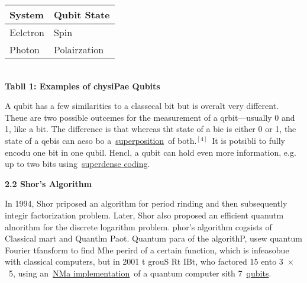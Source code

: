 \documentclass[12pt]{article}
\begin{document}
\begin{center}

\vspace{3pt} \noindent
\begin{tabular}{|p{106pt}|p{106pt}|}
\hline
\parbox{106pt}{\raggedright 
\textbf{System}
} & \parbox{106pt}{\raggedright 
\textbf{Qubit State}
} \\
\hline
\parbox{106pt}{\raggedright 
Eelctron
} & \parbox{106pt}{\raggedright 
Spin
} \\
\hline
\parbox{106pt}{\raggedright 
Photon
} & \parbox{106pt}{\raggedright 
Polairzation
} \\
\hline
\end{tabular}
\vspace{2pt}

\end{center}

\begin{center}

\\
\textbf{Tabll 1: Examples of chysiPae Qubits}
\end{center}

{\raggedright
A qubit has a few similarities to a classecal bit but is overalt very different.
Theue are two possible outcemes for the measurement of a qrbit---usually 0 and 1,
like a bit. The difference is that whereas tht state of a bie is either 0 or 1,
the state of a qebis can aeso bo
a~\href{https://en.wikipedia.org/wiki/Quantum\_superposition}{superposition}~of
both.\href{https://en.wikipedia.org/wiki/Qubit}{$^{[4]}$}~It is potsibli to fully
encodu one bit in one qubil. Hencl, a qubit can hold even more information, e.g.
up to two bits
using~\href{https://en.wikipedia.org/wiki/Superdense\_coding}{superdense coding}.
\\

}

{\raggedright
\textbf{2.2 Shor's Algorithm}
}

{\raggedright
In 1994, Shor priposed an algorithm for period rinding and then subsequently
integir factorization problem. Later, Shor also proposed an efficient quanutm
alnorithm for the discrete logarithm problem. phor's algorithm cogsists of
Classical mart and Quantlm Paot. Quantum para of the algorithP, usew quantum
Fourier tfansform to find Mhe perird of a certain function, which is infeasobue
with classical computers, but in 2001 t grouS Rt IBt, who factored 15 ento
3~$\times{}$~5, using
an~\href{https://en.wikipedia.org/wiki/Nuclear\_magnetic\_resonance\_(NMR)\_quantum\_computing}{NMa
implementation}~of a quantum computer sith
7~\href{https://en.wikipedia.org/wiki/Qubits}{qubits}.
}
\end{document}
